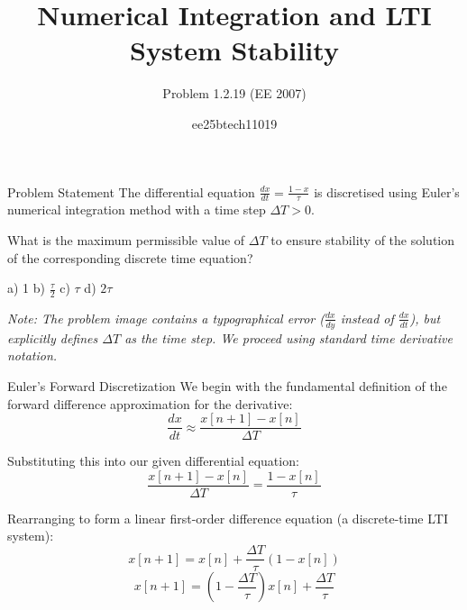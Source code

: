 \documentclass{beamer}
\title{Numerical Integration and LTI System Stability}
\subtitle{Problem 1.2.19 (EE 2007)}
\author{ee25btech11019}
\date{}
\begin{document}
\begin{frame}
    \titlepage
\end{frame}

\begin{frame}{Problem Statement}
    The differential equation $\frac{dx}{dt} = \frac{1-x}{\tau}$ is discretised using Euler's numerical integration method with a time step $\Delta T > 0$. 
    
    What is the maximum permissible value of $\Delta T$ to ensure stability of the solution of the corresponding discrete time equation?
    
    \vspace{0.5cm}
    a) 1 \hspace{1cm} b) $\frac{\tau}{2}$ \hspace{1cm} c) $\tau$ \hspace{1cm} d) $2\tau$
    
    \vspace{1cm}
    \footnotesize{\textit{Note: The problem image contains a typographical error ($\frac{dx}{dy}$ instead of $\frac{dx}{dt}$), but explicitly defines $\Delta T$ as the time step. We proceed using standard time derivative notation.}}
\end{frame}

\begin{frame}{Euler's Forward Discretization}
    We begin with the fundamental definition of the forward difference approximation for the derivative:
    \begin{equation}
        \frac{dx}{dt} \approx \frac{x[n+1] - x[n]}{\Delta T}
    \end{equation}
    
    Substituting this into our given differential equation:
    \begin{equation}
        \frac{x[n+1] - x[n]}{\Delta T} = \frac{1 - x[n]}{\tau}
    \end{equation}
    
    Rearranging to form a linear first-order difference equation (a discrete-time LTI system):
    \begin{equation}
        x[n+1] = x[n] + \frac{\Delta T}{\tau} (1 - x[n])
    \end{equation}
    \begin{equation}
        x[n+1] = \left(1 - \frac{\Delta T}{\tau}\right) x[n] + \frac{\Delta T}{\tau}
    \end{equation}
\end{frame}
\end{document}
